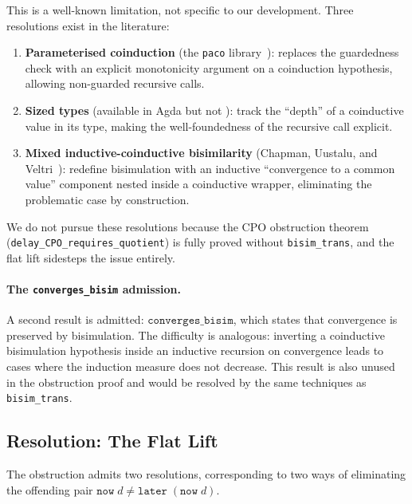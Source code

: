 This is a well-known limitation, not specific to our development.
Three resolutions exist in the literature:
\begin{enumerate}
  \item \textbf{Parameterised coinduction} (the \texttt{paco}
    library~\cite{Capretta2005}): replaces the guardedness check
    with an explicit monotonicity argument on a coinduction
    hypothesis, allowing non-guarded recursive calls.
  \item \textbf{Sized types} (available in Agda but not \Rocq{}):
    track the ``depth'' of a coinductive value in its type, making
    the well-foundedness of the recursive call explicit.
  \item \textbf{Mixed inductive-coinductive bisimilarity}
    (Chapman, Uustalu, and Veltri~\cite{ChapmanUustaluVeltri2019}):
    redefine bisimulation with an inductive ``convergence to a
    common value'' component nested inside a coinductive wrapper,
    eliminating the problematic case by construction.
\end{enumerate}
We do not pursue these resolutions because the CPO obstruction
theorem (\texttt{delay\_CPO\_requires\_quotient}) is fully proved
without \texttt{bisim\_trans}, and the flat lift sidesteps the
issue entirely.

\paragraph{The \texttt{converges\_bisim} admission.}
A second result is admitted:
$\texttt{converges\_bisim}$, which states that convergence is
preserved by bisimulation.
The difficulty is analogous: inverting a coinductive bisimulation
hypothesis inside an inductive recursion on convergence leads to
cases where the induction measure does not decrease.
This result is also unused in the obstruction proof and would
be resolved by the same techniques as \texttt{bisim\_trans}.

\subsection{Resolution: The Flat Lift}
\label{sec:disc-lift-resolution}

The obstruction admits two resolutions, corresponding to two ways of
eliminating the offending pair $\texttt{now}\;d \neq
\texttt{later}\;(\texttt{now}\;d)$.

